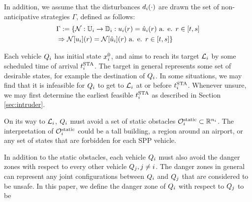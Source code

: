 
In addition, we assume that the disturbances $d_i(\cdot)$ are drawn the set of non-anticipative strategies \cite{Mitchell05} $\Gamma$, defined as follows:
\begin{equation}
\begin{aligned}
& \Gamma := \{\mathcal{N}: \mathbb{U}_i \rightarrow \mathbb{D}_i:  u_i(r) = \hat{u}_i(r) \text{ a. e. } r\in[t,s] \\
& \Rightarrow \mathcal{N}[u_i](r) = \mathcal{N}[\hat{u}_i](r) \text{ a. e. } r\in[t,s]\}
\end{aligned}
\end{equation}

Each vehicle $Q_i$ has initial state $x^0_i$, and aims to reach its target $\mathcal{L}_i$ by some scheduled time of arrival $t^\text{STA}_i$. The target in general represents some set of desirable states, for example the destination of $Q_i$. %
In some situations, we may find that it is infeasible for $Q_i$ to get to $\mathcal{L}_i$ at or before $t^\text{STA}_i$. Whenever unsure, we may first determine the earliest feasible $t^\text{STA}_i$ as described in Section \ref{sec:intruder}. 

On its way to $\mathcal{L}_i$, $Q_i$ must avoid a set of static obstacles $\mathcal{O}^\text{static}_i \subset \mathbb{R}^{n_i}$. The interpretation of $\mathcal{O}^\text{static}_i$ could be a tall building, a region around an airport, or any set of states that are forbidden for each SPP vehicle.

In addition to the static obstacles, each vehicle $Q_i$ must also avoid the danger zones with respect to every other vehicle $Q_j, j\neq i$. The danger zones in general can represent any joint configurations between $Q_i$ and $Q_j$ that are considered to be unsafe. In this paper, we define the danger zone of $Q_i$ with respect to $Q_j$ to be

